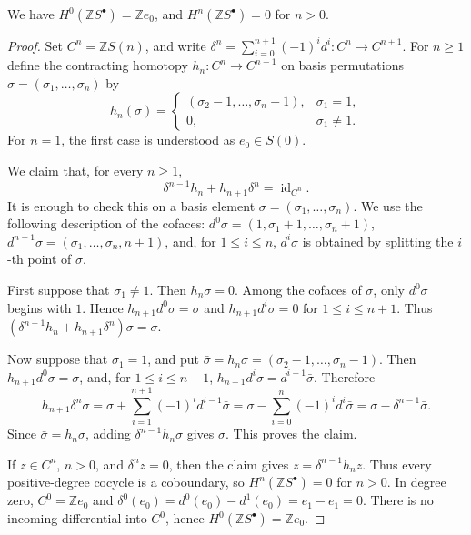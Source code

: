 \documentclass[10pt,a4paper]{amsart}
\begin{document}
\begin{theorem}
We have \(H^0({\mathbb Z}S^\bullet)={\mathbb Z}e_0\), and
\(H^n({\mathbb Z}S^\bullet)=0\) for \(n>0\). 
\end{theorem}

\begin{proof}
Set \(C^n={\mathbb Z}S(n)\), and write
\(\delta^n=\sum_{i=0}^{n+1}(-1)^i d^i:C^n\to C^{n+1}\).  For \(n\geq 1\)
define the contracting homotopy \(h_n:C^n\to C^{n-1}\) on basis permutations
\(\sigma=(\sigma_1,\ldots,\sigma_n)\) by
\[
h_n(\sigma)=
\begin{cases}
(\sigma_2-1,\ldots,\sigma_n-1),& \sigma_1=1,\\
0,& \sigma_1\neq 1.
\end{cases}
\]
For \(n=1\), the first case is understood as \(e_0\in S(0)\).

We claim that, for every \(n\geq 1\),
\[
\delta^{n-1}h_n+h_{n+1}\delta^n=\operatorname{id}_{C^n}.
\]
It is enough to check this on a basis element
\(\sigma=(\sigma_1,\ldots,\sigma_n)\).  We use the following description of the
cofaces: \(d^0\sigma=(1,\sigma_1+1,\ldots,\sigma_n+1)\),
\(d^{n+1}\sigma=(\sigma_1,\ldots,\sigma_n,n+1)\), and, for \(1\leq i\leq n\),
\(d^i\sigma\) is obtained by splitting the \(i\)-th point of \(\sigma\).

First suppose that \(\sigma_1\neq 1\).  Then \(h_n\sigma=0\).  Among the cofaces
of \(\sigma\), only \(d^0\sigma\) begins with \(1\).  Hence
\(h_{n+1}d^0\sigma=\sigma\) and \(h_{n+1}d^i\sigma=0\) for \(1\leq i\leq n+1\).
Thus \((\delta^{n-1}h_n+h_{n+1}\delta^n)\sigma=\sigma\).

Now suppose that \(\sigma_1=1\), and put
\(\bar\sigma=h_n\sigma=(\sigma_2-1,\ldots,\sigma_n-1)\).  Then
\(h_{n+1}d^0\sigma=\sigma\), and, for \(1\leq i\leq n+1\),
\(h_{n+1}d^i\sigma=d^{i-1}\bar\sigma\).  Therefore
\[
h_{n+1}\delta^n\sigma
=\sigma+\sum_{i=1}^{n+1}(-1)^i d^{i-1}\bar\sigma
=\sigma-\sum_{i=0}^{n}(-1)^i d^i\bar\sigma
=\sigma-\delta^{n-1}\bar\sigma.
\]
Since \(\bar\sigma=h_n\sigma\), adding \(\delta^{n-1}h_n\sigma\) gives \(\sigma\).
This proves the claim.

If \(z\in C^n\), \(n>0\), and \(\delta^n z=0\), then the claim gives
\(z=\delta^{n-1}h_nz\).  Thus every positive-degree cocycle is a coboundary, so
\(H^n({\mathbb Z}S^\bullet)=0\) for \(n>0\).  In degree zero,
\(C^0={\mathbb Z}e_0\) and
\(\delta^0(e_0)=d^0(e_0)-d^1(e_0)=e_1-e_1=0\).  There is no incoming
differential into \(C^0\), hence \(H^0({\mathbb Z}S^\bullet)={\mathbb Z}e_0\).
\end{proof}
\end{document}
